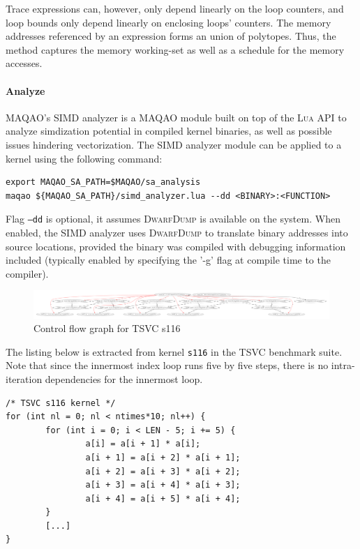 \documentclass[11pt, a4paper, twoside]{montblanc2}
\def\lua{\textsc{Lua}\xspace}
\def\dd{\textsc{DwarfDump}\xspace}
\begin{document}
Trace expressions can, however, only depend linearly on the loop counters, and
loop bounds only depend linearly on enclosing loops' counters. The memory
addresses referenced by an expression forms an union of polytopes. Thus, the
method captures the memory working-set as well as a schedule for the memory
accesses.

\paragraph{Analyze}

MAQAO's SIMD analyzer is a MAQAO module built on top of the \lua API to analyze
simdization potential in compiled kernel binaries, as well as possible issues
hindering vectorization. The SIMD analyzer module can be applied to a kernel
using the following command:

\begin{verbatim}
export MAQAO_SA_PATH=$MAQAO/sa_analysis
maqao ${MAQAO_SA_PATH}/simd_analyzer.lua --dd <BINARY>:<FUNCTION>
\end{verbatim}

Flag \texttt{--dd} is optional, it assumes \dd is available on the system. When
enabled, the SIMD analyzer uses \dd to translate binary addresses into source
locations, provided the binary was compiled with debugging information included
(typically enabled by specifying the '-g' flag at compile time to the compiler).

\begin{figure}[h]
  \centering
\includegraphics[width=1\textwidth]{fs116_l47}
\caption{Control flow graph for TSVC s116}\label{fig:cfgs116}
\end{figure}

The listing below is extracted from kernel \texttt{s116} in the TSVC benchmark
suite. Note that since the innermost index loop runs five by five steps, there is no
intra-iteration dependencies for the innermost loop.
\begin{lstlisting}
/* TSVC s116 kernel */
for (int nl = 0; nl < ntimes*10; nl++) {
        for (int i = 0; i < LEN - 5; i += 5) {
                a[i] = a[i + 1] * a[i];
                a[i + 1] = a[i + 2] * a[i + 1];
                a[i + 2] = a[i + 3] * a[i + 2];
                a[i + 3] = a[i + 4] * a[i + 3];
                a[i + 4] = a[i + 5] * a[i + 4];
        }
        [...]
}
\end{lstlisting}
\end{document}
